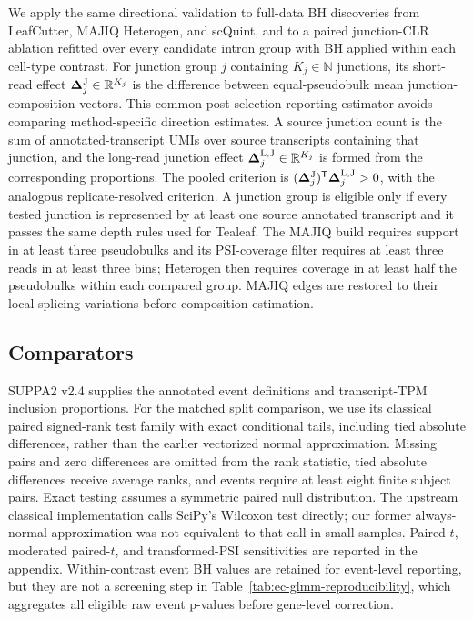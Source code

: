 \documentclass[11pt]{article}
\begin{document}
We apply the same directional validation to full-data BH discoveries from LeafCutter, MAJIQ Heterogen, and scQuint, and to a paired junction-CLR ablation refitted over every candidate intron group with BH applied within each cell-type contrast. For junction group \(j\) containing \(K_j\in\mathbb N\) junctions, its short-read effect \(\bm\Delta_j^{\rm J}\in\mathbb R^{K_j}\) is the difference between equal-pseudobulk mean junction-composition vectors. This common post-selection reporting estimator avoids comparing method-specific direction estimates. A source junction count is the sum of annotated-transcript UMIs over source transcripts containing that junction, and the long-read junction effect \(\bm\Delta_j^{\rm L,J}\in\mathbb R^{K_j}\) is formed from the corresponding proportions. The pooled criterion is \((\bm\Delta_j^{\rm J})^{\mathsf T}\bm\Delta_j^{\rm L,J}>0\), with the analogous replicate-resolved criterion. A junction group is eligible only if every tested junction is represented by at least one source annotated transcript and it passes the same depth rules used for Tealeaf. The MAJIQ build requires support in at least three pseudobulks and its PSI-coverage filter requires at least three reads in at least three bins; Heterogen then requires coverage in at least half the pseudobulks within each compared group. MAJIQ edges are restored to their local splicing variations before composition estimation.

\subsection*{Comparators}

SUPPA2 v2.4 supplies the annotated event definitions and transcript-TPM inclusion proportions. For the matched split comparison, we use its classical paired signed-rank test family with exact conditional tails, including tied absolute differences, rather than the earlier vectorized normal approximation. Missing pairs and zero differences are omitted from the rank statistic, tied absolute differences receive average ranks, and events require at least eight finite subject pairs. Exact testing assumes a symmetric paired null distribution. The upstream classical implementation calls SciPy's Wilcoxon test directly; our former always-normal approximation was not equivalent to that call in small samples. Paired-$t$, moderated paired-$t$, and transformed-PSI sensitivities are reported in the appendix. Within-contrast event BH values are retained for event-level reporting, but they are not a screening step in Table~\ref{tab:ec-glmm-reproducibility}, which aggregates all eligible raw event p-values before gene-level correction.
\end{document}
